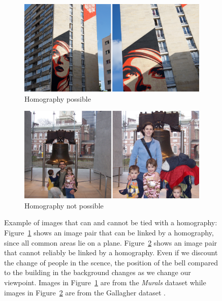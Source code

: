 \begin{figure}[tb]
    \begin{subfigure}[t]{0.5\textwidth}
        \centering
        \includegraphics[width=\textwidth]{images/homography_possible}
        \caption{Homography possible}
        \label{fig:hom_possible}
    \end{subfigure}%
        \quad %
    \begin{subfigure}[t]{0.5\textwidth}
        \centering
        \includegraphics[width=\textwidth]{images/homography_not_possible}
        \caption{Homography not possible}
        \label{fig:hom_impossible}
    \end{subfigure}%
    \caption{Example of images that can and cannot be tied with a 
        homography: Figure~\ref{fig:hom_possible} shows an image pair 
        that can be linked by a homography, since all common areas lie 
        on a plane.  Figure~\ref{fig:hom_impossible} shows an image pair 
        that cannot reliably be linked by a homography. Even if we 
        discount the change of people in the scence, the position of the 
        bell compared to the building in the background changes as we 
        change our viewpoint. Images in Figure~\ref{fig:hom_possible} 
    are from the \emph{Murals} dataset while images in 
Figure~\ref{fig:hom_impossible} are from the Gallagher dataset 
\cite{gallagher2008}.}
    \label{fig:homography_example}
\end{figure}

